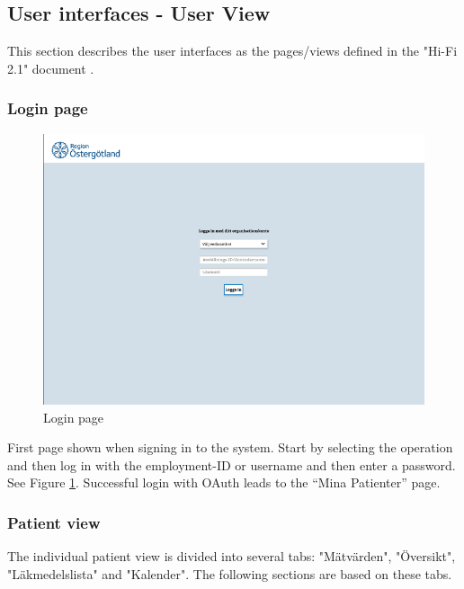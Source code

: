 \documentclass{scrreprt}
\begin{document}
\subsection{User interfaces -  User View}
This section describes the user interfaces as the pages/views defined in the "Hi-Fi 2.1" document \cite{prototype}.

\subsubsection{Login page}
\begin{figure}[h!]
    \centering
    \includegraphics[width=15cm]{login.png}
    \caption{Login page}
    \label{fig: login}
\end{figure}

First page shown when signing in to the system. Start by selecting the operation and then log in with the employment-ID or username and then enter a password. See Figure \ref{fig: login}. Successful login with OAuth leads to the “Mina Patienter” page. 

\subsubsection{Patient view}
The individual patient view is divided into several tabs: "Mätvärden", "Översikt", "Läkmedelslista" and  "Kalender". The following sections are based on these tabs. 
\end{document}
